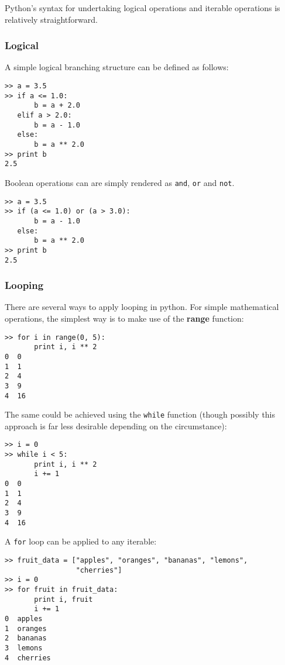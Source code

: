 Python's syntax for undertaking logical operations and iterable operations is relatively straightforward.

\subsubsection{Logical}

A simple logical branching structure can be defined as follows:

\begin{lstlisting}[frame=single]
>> a = 3.5
>> if a <= 1.0:
       b = a + 2.0
   elif a > 2.0:
       b = a - 1.0
   else:
       b = a ** 2.0
>> print b
2.5
\end{lstlisting}

Boolean operations can are simply rendered as \verb=and=, \verb=or= and \verb=not=.
\begin{lstlisting}[frame=single]
>> a = 3.5
>> if (a <= 1.0) or (a > 3.0):
       b = a - 1.0
   else:
       b = a ** 2.0
>> print b
2.5
\end{lstlisting}

\subsubsection{Looping}

There are several ways to apply looping in python. For simple mathematical operations, the simplest way is to make use of the \textbf{range} function:

\begin{lstlisting}[frame=single]
>> for i in range(0, 5):
       print i, i ** 2
0  0
1  1
2  4
3  9
4  16
\end{lstlisting}

The same could be achieved using the \verb=while= function (though possibly this approach is far less desirable depending on the circumstance):

\begin{lstlisting}[frame=single]
>> i = 0
>> while i < 5:
       print i, i ** 2
       i += 1
0  0
1  1
2  4
3  9
4  16
\end{lstlisting}

A \verb=for= loop can be applied to any iterable:

\begin{lstlisting}[frame=single]
>> fruit_data = ["apples", "oranges", "bananas", "lemons", 
                 "cherries"]
>> i = 0
>> for fruit in fruit_data:
       print i, fruit
       i += 1
0  apples
1  oranges
2  bananas
3  lemons
4  cherries 
\end{lstlisting}

